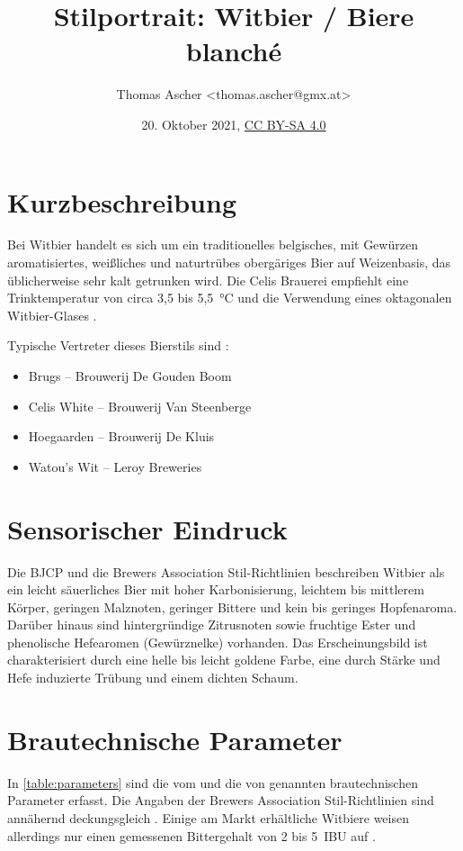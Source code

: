\documentclass[a4paper,parskip=half]{scrartcl}
\title{Stilportrait: Witbier / Biere blanché}
\author{Thomas Ascher <thomas.ascher@gmx.at>}
\date{20. Oktober 2021, \href{http://creativecommons.org/licenses/by-sa/4.0/}{CC BY-SA 4.0}}
\begin{document}
\maketitle

\section*{Kurzbeschreibung}

Bei Witbier handelt es sich um ein traditionelles belgisches, mit Gewürzen
aromatisiertes, weißliches und naturtrübes obergäriges Bier auf Weizenbasis, das
üblicherweise sehr kalt getrunken wird. \parencite[1\psq]{Strottner1999}
Die Celis Brauerei empfiehlt eine Trinktemperatur von circa 3,5 bis 5,5~°C
und die Verwendung eines oktagonalen Witbier-Glases \parencite{CelisBrewery2021}.

Typische Vertreter dieses Bierstils sind \parencite{Roncoroni2018}:

\begin{itemize}
\item Brugs -- Brouwerij De Gouden Boom
\item Celis White -- Brouwerij Van Steenberge
\item Hoegaarden -- Brouwerij De Kluis
\item Watou's Wit -- Leroy Breweries
\end{itemize}

\section*{Sensorischer Eindruck}

Die BJCP und die Brewers Association Stil-Richtlinien beschreiben
Witbier als ein leicht säuerliches Bier mit hoher Karbonisierung,
leichtem bis mittlerem Körper, geringen Malznoten, geringer Bittere
und kein bis geringes Hopfenaroma. Darüber hinaus sind hintergründige
Zitrusnoten sowie fruchtige Ester und phenolische Hefearomen (Gewürznelke)
vorhanden. Das Erscheinungsbild ist charakterisiert durch eine helle
bis leicht goldene Farbe, eine durch Stärke und Hefe induzierte Trübung
und einem dichten Schaum. \parencites[48\psq]{BJCP2015}[24]{BA2021}

\section*{Brautechnische Parameter}

In \autoref{table:parameters} sind die vom \citeauthor{BJCP2015} und die von
\citeauthor{Strottner1999} genannten brautechnischen Parameter erfasst.
Die Angaben der Brewers Association Stil-Richtlinien sind annähernd
deckungsgleich \parencites[24]{BA2021}. Einige am Markt erhältliche
Witbiere weisen allerdings nur einen gemessenen Bittergehalt von
2 bis 5~IBU auf \parencite{Roncoroni2018}.
\end{document}

